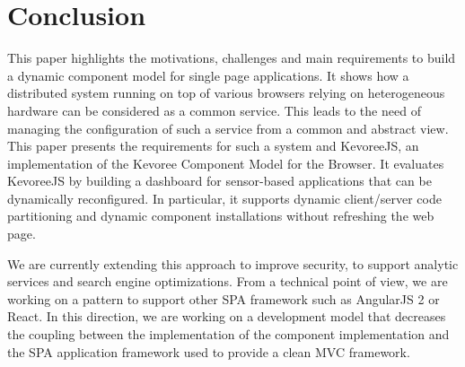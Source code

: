 \section{Conclusion}
This paper highlights the motivations, challenges and main requirements to build a dynamic component model for single page applications. It shows how a distributed system running on top of various browsers relying on heterogeneous hardware can be considered as a common service. This leads to the need of managing the configuration of such a service from a common and abstract view. This paper presents the requirements for such a system and KevoreeJS, an implementation of the Kevoree Component Model for the Browser. It evaluates KevoreeJS by building a dashboard for sensor-based applications that can be dynamically reconfigured. In particular, it supports dynamic client/server code partitioning and dynamic component installations without refreshing the web page.

We are currently extending this approach to improve security, to support analytic services and search engine optimizations. From a technical point of view, we are working on a pattern to support other SPA framework such as AngularJS 2 or React. In this direction, we are working on a development model that decreases the coupling between the implementation of the component implementation and the SPA application framework used to provide a clean MVC framework.  %
